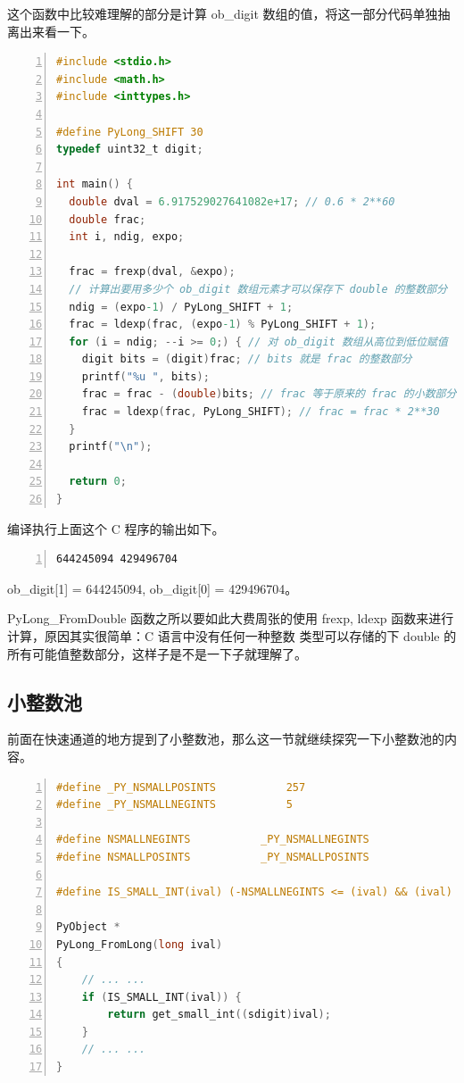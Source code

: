 这个函数中比较难理解的部分是计算 ob\_digit 数组的值，将这一部分代码单独抽离出来看一下。

\begin{lstlisting}[language=C, numbers=left, numbersep=1em, numberstyle=\footnotesize , breaklines=true]
#include <stdio.h>
#include <math.h>
#include <inttypes.h>

#define PyLong_SHIFT 30
typedef uint32_t digit;

int main() {
  double dval = 6.917529027641082e+17; // 0.6 * 2**60
  double frac;
  int i, ndig, expo;

  frac = frexp(dval, &expo);
  // 计算出要用多少个 ob_digit 数组元素才可以保存下 double 的整数部分
  ndig = (expo-1) / PyLong_SHIFT + 1;
  frac = ldexp(frac, (expo-1) % PyLong_SHIFT + 1);
  for (i = ndig; --i >= 0;) { // 对 ob_digit 数组从高位到低位赋值
    digit bits = (digit)frac; // bits 就是 frac 的整数部分
    printf("%u ", bits);
    frac = frac - (double)bits; // frac 等于原来的 frac 的小数部分
    frac = ldexp(frac, PyLong_SHIFT); // frac = frac * 2**30
  }
  printf("\n");

  return 0;
}
\end{lstlisting}

编译执行上面这个 C 程序的输出如下。
\begin{lstlisting}[language=bash, numbers=left, numbersep=1em, numberstyle=\footnotesize , breaklines=true]
644245094 429496704
\end{lstlisting}

ob\_digit[1] = 644245094, ob\_digit[0] = 429496704。

PyLong\_FromDouble 函数之所以要如此大费周张的使用 frexp, ldexp 函数来进行计算，原因其实很简单：C 语言中没有任何一种整数
类型可以存储的下 double 的所有可能值整数部分，这样子是不是一下子就理解了。


\subsection{小整数池}

前面在快速通道的地方提到了小整数池，那么这一节就继续探究一下小整数池的内容。

\begin{lstlisting}[language=C, numbers=left, numbersep=1em, numberstyle=\footnotesize , breaklines=true]
#define _PY_NSMALLPOSINTS           257
#define _PY_NSMALLNEGINTS           5

#define NSMALLNEGINTS           _PY_NSMALLNEGINTS
#define NSMALLPOSINTS           _PY_NSMALLPOSINTS

#define IS_SMALL_INT(ival) (-NSMALLNEGINTS <= (ival) && (ival) < NSMALLPOSINTS)

PyObject *
PyLong_FromLong(long ival)
{
	// ... ...
    if (IS_SMALL_INT(ival)) {
        return get_small_int((sdigit)ival);
    }
    // ... ...
}
\end{lstlisting}

